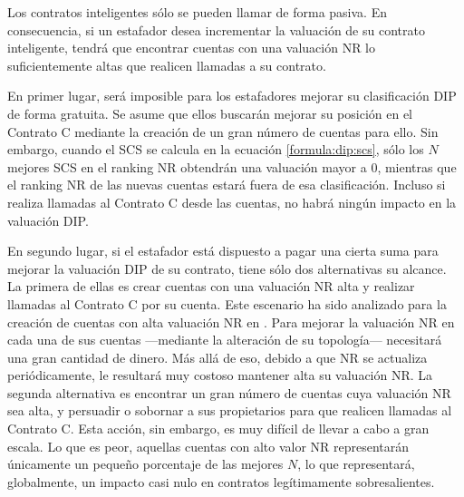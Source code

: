 Los contratos inteligentes sólo se pueden llamar de forma pasiva. En consecuencia, si un estafador desea incrementar la valuación de su contrato inteligente, tendrá que encontrar cuentas con una valuación NR lo suficientemente altas que realicen llamadas a su contrato.

En primer lugar, será imposible para los estafadores mejorar su clasificación DIP de forma gratuita. Se asume que ellos buscarán mejorar su posición en el Contrato C mediante la creación de un gran número de cuentas para ello. Sin embargo, cuando el SCS se calcula en la ecuación \ref{formula:dip:scs}, sólo los $N$ mejores SCS en el ranking NR obtendrán una valuación mayor a 0, mientras que el ranking NR de las nuevas cuentas estará fuera de esa clasificación. Incluso si realiza llamadas al Contrato C desde las cuentas, no habrá ningún impacto en la valuación DIP.

En segundo lugar, si el estafador está dispuesto a pagar una cierta suma para mejorar la valuación DIP de su contrato, tiene sólo dos alternativas su alcance. La primera de ellas es crear cuentas con una valuación NR alta y realizar llamadas al Contrato C por su cuenta. Este escenario ha sido analizado para la creación de cuentas con alta valuación NR en . Para mejorar la valuación NR en cada una de sus cuentas —mediante la alteración de su topología— necesitará una gran cantidad de dinero. Más allá de eso, debido a que NR se actualiza periódicamente, le resultará muy costoso mantener alta su valuación NR. La segunda alternativa es encontrar un gran número de cuentas cuya valuación NR sea alta, y persuadir o sobornar a sus propietarios para que realicen llamadas al Contrato C. Esta acción, sin embargo, es muy difícil de llevar a cabo a gran escala. Lo que es peor, aquellas cuentas con alto valor NR representarán únicamente un pequeño porcentaje de las mejores $N$, lo que representará, globalmente, un impacto casi nulo en contratos legítimamente sobresalientes.